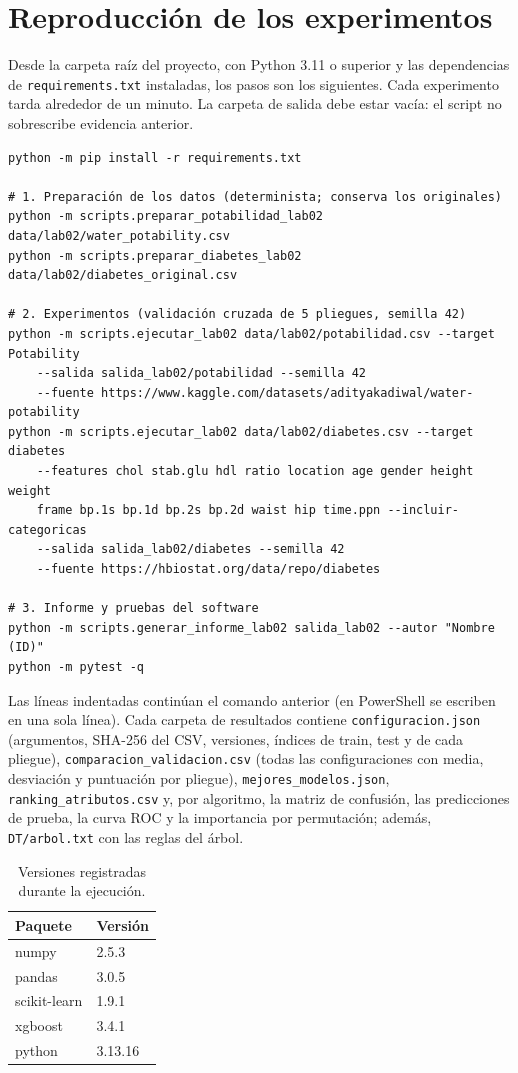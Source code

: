 \documentclass[11pt]{article}
\begin{document}
\clearpage

\appendix

\section{Reproducción de los experimentos}

Desde la carpeta raíz del proyecto, con Python 3.11 o superior y las dependencias de
\texttt{requirements.txt} instaladas, los pasos son los siguientes. Cada
experimento tarda alrededor de un minuto. La carpeta de salida debe estar vacía: el
script no sobrescribe evidencia anterior.

\begin{verbatim}
python -m pip install -r requirements.txt

# 1. Preparación de los datos (determinista; conserva los originales)
python -m scripts.preparar_potabilidad_lab02 data/lab02/water_potability.csv
python -m scripts.preparar_diabetes_lab02 data/lab02/diabetes_original.csv

# 2. Experimentos (validación cruzada de 5 pliegues, semilla 42)
python -m scripts.ejecutar_lab02 data/lab02/potabilidad.csv --target Potability
    --salida salida_lab02/potabilidad --semilla 42
    --fuente https://www.kaggle.com/datasets/adityakadiwal/water-potability
python -m scripts.ejecutar_lab02 data/lab02/diabetes.csv --target diabetes
    --features chol stab.glu hdl ratio location age gender height weight
    frame bp.1s bp.1d bp.2s bp.2d waist hip time.ppn --incluir-categoricas
    --salida salida_lab02/diabetes --semilla 42
    --fuente https://hbiostat.org/data/repo/diabetes

# 3. Informe y pruebas del software
python -m scripts.generar_informe_lab02 salida_lab02 --autor "Nombre (ID)"
python -m pytest -q
\end{verbatim}

Las líneas indentadas continúan el comando anterior (en PowerShell se escriben en una
sola línea). Cada carpeta de resultados contiene \texttt{configuracion.json} (argumentos,
SHA-256 del CSV, versiones, índices de train, test y de cada pliegue),
\texttt{comparacion\_validacion.csv} (todas las configuraciones con media, desviación y
puntuación por pliegue), \texttt{mejores\_modelos.json}, \texttt{ranking\_atributos.csv}
y, por algoritmo, la matriz de confusión, las predicciones de prueba, la curva ROC y la
importancia por permutación; además, \texttt{DT/arbol.txt} con las reglas del árbol.


\begin{table}[H]\centering\small
\caption{Versiones registradas durante la ejecución.}
\begin{tabular}{ll}\toprule
Paquete & Versión \\ \midrule
numpy & 2.5.3 \\
pandas & 3.0.5 \\
scikit-learn & 1.9.1 \\
xgboost & 3.4.1 \\
python & 3.13.16 \\
\bottomrule\end{tabular}
\end{table}
\end{document}
